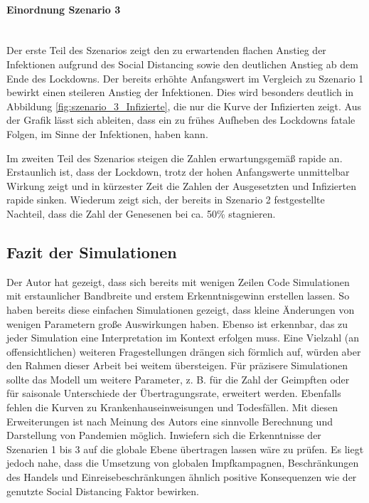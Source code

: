 \documentclass[12pt]{article}
\begin{document}
\paragraph{Einordnung Szenario 3} \mbox{} \\
Der erste Teil des Szenarios zeigt den zu erwartenden flachen Anstieg der Infektionen aufgrund des Social Distancing sowie den deutlichen Anstieg ab dem Ende des Lockdowns. Der bereits erhöhte Anfangswert im Vergleich zu Szenario 1 bewirkt einen steileren Anstieg der Infektionen. Dies wird besonders deutlich in Abbildung \ref{fig:szenario_3_Infizierte}, die nur die Kurve der Infizierten zeigt. Aus der Grafik lässt sich ableiten, dass ein zu frühes Aufheben des Lockdowns fatale Folgen, im Sinne der Infektionen, haben kann.

Im zweiten Teil des Szenarios steigen die Zahlen erwartungsgemäß rapide an. Erstaunlich ist, dass der Lockdown, trotz der hohen Anfangswerte unmittelbar Wirkung zeigt und in kürzester Zeit die Zahlen der Ausgesetzten und Infizierten rapide sinken. Wiederum zeigt sich, der bereits in Szenario 2 festgestellte Nachteil, dass die Zahl der Genesenen bei ca. 50\% stagnieren.

\subsection{Fazit der Simulationen}
Der Autor hat gezeigt, dass sich bereits mit wenigen Zeilen Code Simulationen mit erstaunlicher Bandbreite und erstem Erkenntnisgewinn erstellen lassen. So haben bereits diese einfachen Simulationen gezeigt, dass kleine Änderungen von wenigen Parametern große Auswirkungen haben. Ebenso ist erkennbar, das zu jeder Simulation eine Interpretation im Kontext erfolgen muss. Eine Vielzahl (an offensichtlichen) weiteren Fragestellungen drängen sich förmlich auf, würden aber den Rahmen dieser Arbeit bei weitem übersteigen. Für präzisere Simulationen sollte das Modell um weitere Parameter, z. B. für die Zahl der Geimpften oder für saisonale Unterschiede der Übertragungsrate, erweitert werden. Ebenfalls fehlen die Kurven zu Krankenhauseinweisungen und Todesfällen. Mit diesen Erweiterungen ist nach Meinung des Autors eine sinnvolle Berechnung und Darstellung von Pandemien möglich. Inwiefern sich die Erkenntnisse der Szenarien 1 bis 3 auf die globale Ebene übertragen lassen wäre zu prüfen. Es liegt jedoch nahe, dass die Umsetzung von globalen Impfkampagnen, Beschränkungen des Handels und Einreisebeschränkungen ähnlich positive Konsequenzen wie der genutzte Social Distancing Faktor bewirken. 
\end{document}
